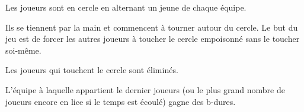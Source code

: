 \documentclass{grand-jeu}
\begin{document}
\begin{liste-materiel}
\end{liste-materiel}

\begin{regles}
Les joueurs sont en cercle en alternant un jeune de chaque équipe.

Ils se tiennent par la main et commencent à tourner autour du cercle. Le but du jeu est de forcer les autres joueurs à toucher le cercle empoisonné sans le toucher soi-même. 

Les joueurs qui touchent le cercle sont éliminés.

L'équipe à laquelle appartient le dernier joueurs (ou le plus grand nombre de joueurs encore en lice si le temps est écoulé) gagne des b-dures.
\end{regles}

\begin{imaginaire} 
\end{imaginaire}

\begin{moments-stop}
\end{moments-stop}
\end{document}
